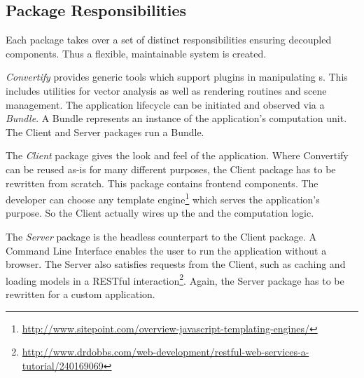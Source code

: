 \documentclass[../ClassicThesis.tex]{subfiles}
\begin{document}

\subsection{Package Responsibilities}

Each package takes over a set of distinct responsibilities ensuring decoupled components. Thus a flexible, maintainable system is created.

\emph{Convertify} provides generic tools which support plugins in manipulating {\threedmodel}s. This includes utilities
for vector analysis as well as rendering routines and scene management. The application lifecycle can be initiated and
observed via a \emph{Bundle}. A Bundle represents an instance of the application's computation unit. The Client and
Server packages run a Bundle.

The \emph{Client} package gives the look and feel of the application. Where Convertify can be reused as-is for many
different purposes, the Client package has to be rewritten from scratch. This package contains frontend components. The
developer can choose any template
engine\footnote{\url{http://www.sitepoint.com/overview-javascript-templating-engines/}} which serves the application's
purpose. So the Client actually wires up the {\userinterface} and the computation logic.

The \emph{Server} package is the headless counterpart to the Client package. A Command Line Interface enables the user
to run the application without a browser. The Server also satisfies requests from the Client, such as caching and
loading models in a RESTful
interaction\footnote{\url{http://www.drdobbs.com/web-development/restful-web-services-a-tutorial/240169069}}. Again, the
Server package has to be rewritten for a custom application.
\end{document}
